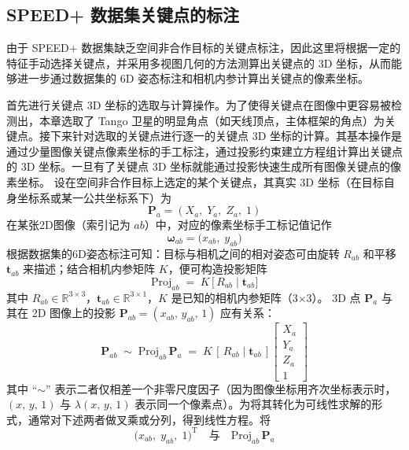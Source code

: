 \subsection{SPEED+ 数据集关键点的标注}
由于 SPEED+ 数据集缺乏空间非合作目标的关键点标注，因此这里将根据一定的特征手动选择关键点，并采用多视图几何的方法测算出关键点的 3D 坐标，从而能够进一步通过数据集的 6D 姿态标注和相机内参计算出关键点的像素坐标。

首先进行关键点 3D 坐标的选取与计算操作。为了使得关键点在图像中更容易被检测出，本章选取了 Tango 卫星的明显角点（如天线顶点，主体框架的角点）为关键点。接下来针对选取的关键点进行逐一的关键点 3D 坐标的计算。其基本操作是通过少量图像关键点像素坐标的手工标注，通过投影约束建立方程组计算出关键点的 3D 坐标。一旦有了关键点 3D 坐标就能通过投影快速生成所有图像关键点的像素坐标。
设在空间非合作目标上选定的某个关键点，其真实 3D 坐标（在目标自身坐标系或某一公共坐标系下）为
\begin{equation}
	\mathbf{P}_a = (X_a,\; Y_a,\; Z_a,\; 1)
\end{equation}
在某张2D图像（索引记为 $ab$）中，对应的像素坐标手工标记值记作
\begin{equation}
	\boldsymbol{\omega}_{ab} = \bigl(x_{ab},\; y_{ab}\bigr)
\end{equation}
根据数据集的6D姿态标注可知：目标与相机之间的相对姿态可由旋转 $R_{ab}$ 和平移 $\mathbf{t}_{ab}$ 来描述；结合相机内参矩阵 $K$，便可构造投影矩阵
\begin{equation}\label{eq:proj_ab_def}
	\mathrm{Proj}_{ab} \;=\; K\,\bigl[\,R_{ab}\;\big\vert\;\mathbf{t}_{ab}\bigr]
\end{equation}
其中 $R_{ab}\in\mathbb{R}^{3\times 3}$，$\mathbf{t}_{ab}\in\mathbb{R}^{3\times 1}$，$K$ 是已知的相机内参矩阵（3$\times$3）。
3D 点 $\mathbf{P}_a$ 与其在 2D 图像上的投影 $\mathbf{P}_{ab} = (x_{ab},\,y_{ab},\,1)$ 应有关系：
\begin{equation}
	\mathbf{P}_{ab}
	\;\sim\;
	\mathrm{Proj}_{ab}\,\mathbf{P}_a
	\;=\;
	K\,[\,R_{ab}\mid\mathbf{t}_{ab}\,]
	\begin{bmatrix}
		X_a\\[4pt] Y_a\\[4pt] Z_a\\[4pt] 1
	\end{bmatrix}
\end{equation}
其中 ``$\sim$'' 表示二者仅相差一个非零尺度因子（因为图像坐标用齐次坐标表示时，$(x,\,y,\,1)$ 与 $\lambda(x,\,y,\,1)$ 表示同一个像素点）。为将其转化为可线性求解的形式，通常对下述两者做叉乘或分列，得到线性方程。将
\begin{equation}
	\bigl(x_{ab},\;y_{ab},\;1\bigr)^\mathrm{T}
	\quad\text{与}\quad
	\mathrm{Proj}_{ab}\,\mathbf{P}_a
\end{equation}
